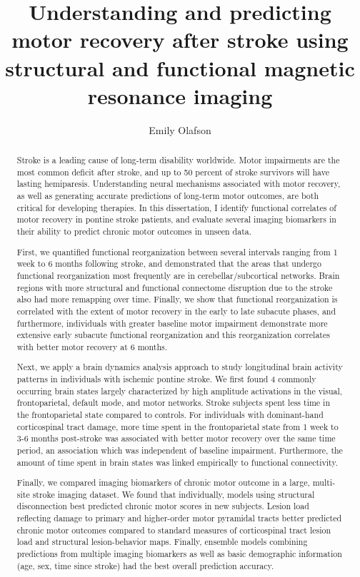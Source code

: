 \documentclass[phd,tocprelim]{cornell}
\title {Understanding and predicting motor recovery after stroke using structural and functional magnetic resonance imaging}
\author {Emily Olafson}
\begin{document}
\maketitle
\makecopyright

\begin{abstract}

Stroke is a leading cause of long-term disability worldwide.  Motor impairments are the most common deficit after stroke, and up to 50 percent of stroke survivors will have lasting hemiparesis. Understanding neural mechanisms associated with motor recovery,  as well as generating accurate predictions of long-term motor outcomes, are both critical for developing therapies. In this dissertation, I identify functional correlates of motor recovery in pontine stroke patients, and evaluate several imaging biomarkers in their ability to predict chronic motor outcomes in unseen data.


First, we quantified functional reorganization between several intervals ranging from 1 week to 6 months following stroke, and demonstrated that the areas that undergo functional reorganization most frequently are in cerebellar/subcortical networks. Brain regions with more structural and functional connectome disruption due to the stroke also had more remapping over time. Finally, we show that functional reorganization is correlated with the extent of motor recovery in the early to late subacute phases, and furthermore, individuals with greater baseline motor impairment demonstrate more extensive early subacute functional reorganization and this reorganization correlates with better motor recovery at 6 months.  


Next, we apply a brain dynamics analysis approach to study longitudinal brain activity patterns in individuals with ischemic pontine stroke. We first found 4 commonly occurring brain states largely characterized by high amplitude activations in the visual, frontoparietal, default mode, and motor networks. Stroke subjects spent less time in the frontoparietal state compared to controls. For individuals with dominant-hand corticospinal tract damage, more time spent in the frontoparietal state from 1 week to 3-6 months post-stroke was associated with better motor recovery over the same time period, an association which was independent of baseline impairment. Furthermore, the amount of time spent in brain states was linked empirically to functional connectivity.

Finally, we compared imaging biomarkers of chronic motor outcome in a large, multi-site stroke imaging dataset. We found that individually, models using structural disconnection best predicted chronic motor scores in new subjects. Lesion load reflecting damage to primary and higher-order motor pyramidal tracts better predicted chronic motor outcomes compared to standard measures of corticospinal tract lesion load and structural lesion-behavior maps. Finally, ensemble models combining predictions from multiple imaging biomarkers as well as basic demographic information (age, sex, time since stroke) had the best overall prediction accuracy.


\end{abstract}
\end{document}
